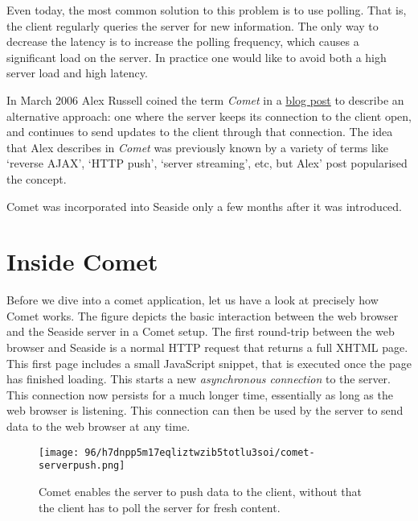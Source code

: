 \documentclass[a4paper,10pt,twoside]{book}
\begin{document}
Even today, the most common solution to this problem is to use polling. That is, the client regularly queries the server for new information. The only way to decrease the latency is to increase the polling frequency, which causes a significant load on the server. In practice one would like to avoid both a high server load and high latency.

In March 2006 Alex Russell coined the term \textit{Comet} in a \href{http://alex.dojotoolkit.org/2006/03/comet-low-latency-data-for-the-browser/}{blog post} to describe an alternative approach: one where the server keeps its connection to the client open, and continues to send updates to the client through that connection. The idea that Alex describes in \textit{Comet} was previously known by a variety of terms like `reverse AJAX', `HTTP push', `server streaming', etc, but Alex' post  popularised the concept.

Comet was incorporated into Seaside only a few months after it was introduced. 

\section{Inside Comet}
\label{book:web20:comet:inside}

Before we dive into a comet application, let us have a look at precisely how Comet works. The figure depicts the basic interaction between the web browser and the Seaside server in a Comet setup. The first round-trip between the web browser and Seaside is a normal HTTP request that returns a full XHTML page. This first page includes a small JavaScript snippet, that is executed once the page has finished loading. This starts a new \textit{asynchronous connection} to the server. This connection now persists for a much longer time, essentially as long as the web browser is listening. This connection can then be used by the server to send data to the web browser at any time.  

\begin{figure}[h!tbp]
	\begin{center}
		\texttt{[image: 96/h7dnpp5m17eqliztwzib5totlu3soi/comet-serverpush.png]}
		\caption{Comet enables the server to push data to the client, without that the client has to poll the server for fresh content.\label{book:web20:comet:inside:cometserverpush}}
	\end{center}
\end{figure}
\end{document}
